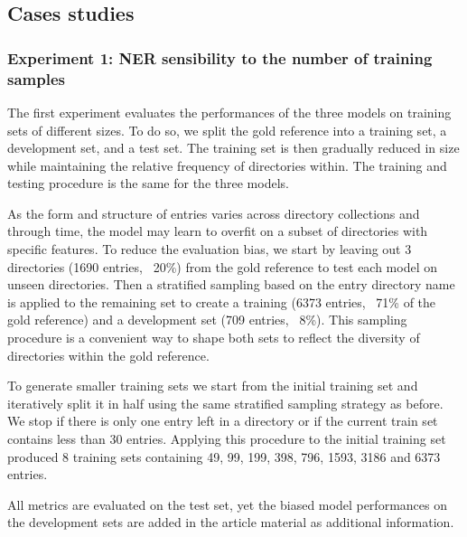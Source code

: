 \subsection{Cases studies}
\subsubsection{Experiment 1: NER sensibility to the number of training samples}
The first experiment evaluates the performances of the three models on training sets of different sizes.
To do so, we split the gold reference into a training set, a development set, and a test set. The training set is then gradually reduced in size while maintaining the relative frequency of directories within.
The training and testing procedure is the same for the three models.

As the form and structure of entries varies across directory collections and through time, the model may learn to overfit on a subset of directories with specific features.
To reduce the evaluation bias, we start by leaving out 3 directories (1690 entries, ~20\%) from the gold reference to test each model on unseen directories.
Then a stratified sampling based on the entry directory name is applied to the remaining set to create a training (6373 entries, ~71\% of the gold reference) and a development set (709 entries, ~8\%).
This sampling procedure is a convenient way to shape both sets to reflect the diversity of directories within the gold reference.

To generate smaller training sets we start from the initial training set and iteratively split it in half using the same stratified sampling strategy as before.
We stop if there is only one entry left in a directory or if the current train set contains less than 30 entries.
Applying this procedure to the initial training set produced 8 training sets containing 49, 99, 199, 398, 796, 1593, 3186 and 6373 entries.

All metrics are evaluated on the test set, yet the biased model performances on the development sets are added in the article material as additional information.





